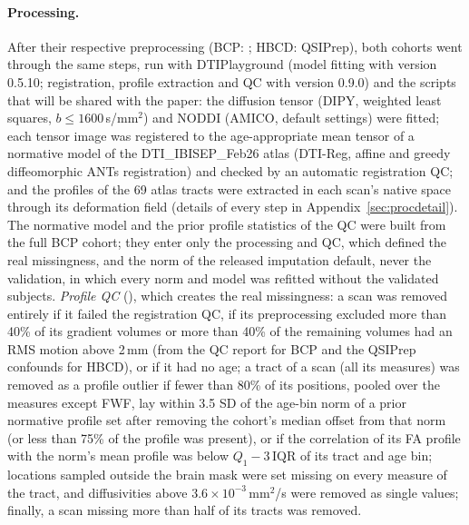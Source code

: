 \documentclass[11pt]{article}
\begin{document}
\paragraph{Processing.} After their respective preprocessing (BCP: ; HBCD: QSIPrep), both cohorts
went through the same steps, run with DTIPlayground (model fitting with version 0.5.10; registration, profile extraction and QC with
version 0.9.0) and the scripts that will be shared with the paper: the diffusion tensor (DIPY, weighted least squares, $b \le
1600$\,s/mm$^2$) and NODDI (AMICO, default settings) were fitted; each tensor image was registered to the age-appropriate
mean tensor of a normative model of the DTI\_IBISEP\_Feb26 atlas \citep{short2022atlas} (DTI-Reg, affine and greedy
diffeomorphic ANTs registration) and checked by an automatic registration QC; and the profiles of the 69 atlas tracts were
extracted in each scan's native space through its deformation field (details of every step in
Appendix~\ref{sec:procdetail}). The normative model and the prior profile statistics of the QC were built from the full
BCP cohort; they enter only the processing and QC, which defined the real missingness, and the norm of the released
imputation default, never the validation, in which every norm and model was refitted without the validated subjects.
\emph{Profile QC}
(), which creates the real missingness: a scan was removed entirely if it failed the
registration QC, if its preprocessing excluded more than 40\% of its gradient volumes or more than 40\% of the remaining
volumes had an RMS motion above 2\,mm (from the  QC report for BCP and the QSIPrep confounds for HBCD), or if it had no age; a tract of a scan (all its measures) was removed as a profile outlier if fewer than
80\% of its positions, pooled over the measures except FWF, lay within 3.5 SD of the age-bin norm of a prior normative
profile set after removing the cohort's median offset from that norm (or less than 75\% of the profile was present), or if
the correlation of its FA profile with the norm's mean profile was below $Q_1 - 3\,\mathrm{IQR}$ of its tract and age bin;
locations sampled outside the brain mask were set missing on every measure of the tract, and diffusivities above
$3.6\times10^{-3}$\,mm$^2$/s were removed as single values; finally, a scan missing more than half of its tracts was
removed.
\end{document}
